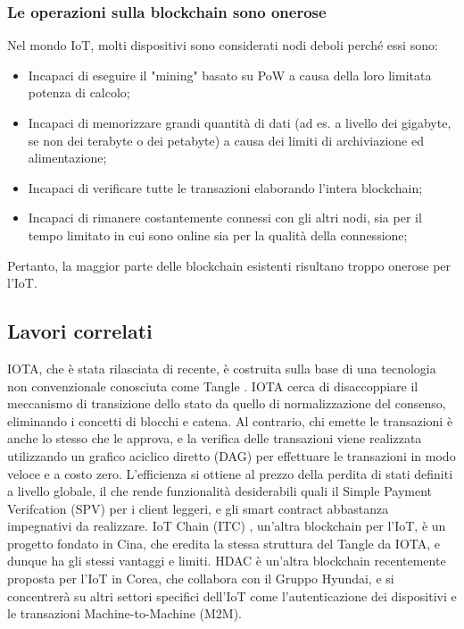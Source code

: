 \subsubsection{Le operazioni sulla blockchain sono onerose}
Nel mondo IoT, molti dispositivi sono considerati nodi deboli perché essi sono:
\begin{itemize}
	\item
	      Incapaci di eseguire il "mining" basato su PoW a causa della loro limitata potenza di calcolo;
	\item
	      Incapaci di memorizzare grandi quantità di dati (ad es. a livello dei gigabyte, se non dei terabyte o dei petabyte) a causa dei limiti di archiviazione ed alimentazione;
	\item
	      Incapaci di verificare tutte le transazioni elaborando l'intera blockchain;
	\item
	      Incapaci di rimanere costantemente connessi con gli altri nodi, sia per il tempo limitato in cui sono online sia per la qualità della connessione;
\end{itemize}
Pertanto, la maggior parte delle blockchain esistenti risultano troppo onerose per l'IoT.

\subsection{Lavori correlati}
IOTA, che è stata rilasciata di recente, è costruita sulla base di una tecnologia non convenzionale conosciuta come Tangle \cite{c24}. IOTA cerca di disaccoppiare il meccanismo di transizione dello stato da quello di normalizzazione del consenso, eliminando i concetti di blocchi e catena. Al contrario, chi emette le transazioni è anche lo stesso che le approva, e la verifica delle transazioni viene realizzata utilizzando un grafico aciclico diretto (DAG) per effettuare le transazioni in modo veloce e a costo zero. L'efficienza si ottiene al prezzo della perdita di stati definiti a livello globale, il che rende funzionalità desiderabili quali il Simple Payment Verifcation (SPV) per i client leggeri, e gli smart contract abbastanza impegnativi da realizzare. IoT Chain (ITC) \cite{c16}, un'altra blockchain per l'IoT, è un progetto fondato in Cina, che eredita la stessa struttura del Tangle da IOTA, e dunque ha gli stessi vantaggi e limiti. HDAC \cite{c13} è un'altra blockchain recentemente proposta per l'IoT in Corea, che collabora con il Gruppo Hyundai, e si concentrerà su altri settori specifici dell'IoT come l'autenticazione dei dispositivi e le transazioni Machine-to-Machine (M2M).
